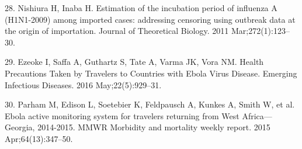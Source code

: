 \documentclass[]{article}
\begin{document}
\hypertarget{ref-Nishiura:2011dc}{}
28. Nishiura H, Inaba H. Estimation of the incubation period of
influenza A (H1N1-2009) among imported cases: addressing censoring using
outbreak data at the origin of importation. Journal of Theoretical
Biology. 2011 Mar;272(1):123--30.

\hypertarget{ref-Ezeoke:2016jv}{}
29. Ezeoke I, Saffa A, Guthartz S, Tate A, Varma JK, Vora NM. Health
Precautions Taken by Travelers to Countries with Ebola Virus Disease.
Emerging Infectious Diseases. 2016 May;22(5):929--31.

\hypertarget{ref-Parham:2015wf}{}
30. Parham M, Edison L, Soetebier K, Feldpausch A, Kunkes A, Smith W, et
al. Ebola active monitoring system for travelers returning from West
Africa---Georgia, 2014-2015. MMWR Morbidity and mortality weekly report.
2015 Apr;64(13):347--50.
\end{document}
